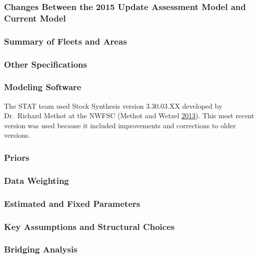\documentclass[12pt,]{article}
\begin{document}
\subsubsection{Changes Between the 2015 Update Assessment Model and
Current
Model}\label{changes-between-the-2015-update-assessment-model-and-current-model}

\subsubsection{Summary of Fleets and
Areas}\label{summary-of-fleets-and-areas}

\subsubsection{Other Specifications}\label{other-specifications}

\subsubsection{Modeling Software}\label{modeling-software}

The STAT team used Stock Synthesis version 3.30.03.XX developed by
Dr.~Richard Methot at the NWFSC (Methot and Wetzel
\protect\hyperlink{ref-methot_stock_2013}{2013}). This most recent
version was used because it included improvements and corrections to
older versions.

\subsubsection{Priors}\label{priors}

\subsubsection{Data Weighting}\label{data-weighting}

\subsubsection{Estimated and Fixed
Parameters}\label{estimated-and-fixed-parameters}

\subsubsection{Key Assumptions and Structural
Choices}\label{key-assumptions-and-structural-choices}

\subsubsection{Bridging Analysis}\label{bridging-analysis}
\end{document}
